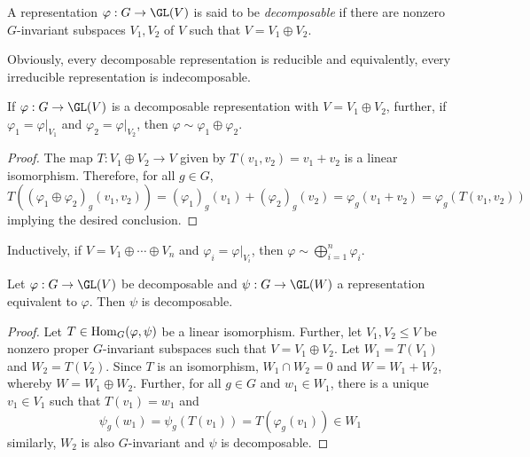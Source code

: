 \begin{definition}
    A representation $\varphi: G\to\GL(V)$ is said to be \textit{decomposable} if there are nonzero $G$-invariant subspaces $V_1,V_2$ of $V$ such that $V = V_1\oplus V_2$.
\end{definition}

Obviously, every decomposable representation is reducible and equivalently, every irreducible representation is indecomposable.

\begin{proposition}
    If $\varphi: G\to\GL(V)$ is a decomposable representation with $V = V_1\oplus V_2$, further, if $\varphi_1 = \varphi|_{V_1}$ and $\varphi_2 = \varphi|_{V_2}$, then $\varphi\sim\varphi_1\oplus\varphi_2$.
\end{proposition}
\begin{proof}
    The map $T: V_1\oplus V_2\to V$ given by $T(v_1,v_2) = v_1 + v_2$ is a linear isomorphism. Therefore, for all $g\in G$,
    \begin{equation*}
        T((\varphi_1\oplus\varphi_2)_g(v_1,v_2)) = (\varphi_1)_g(v_1) + (\varphi_2)_g(v_2) = \varphi_g(v_1 + v_2) = \varphi_g(T(v_1,v_2))
    \end{equation*}
    implying the desired conclusion.
\end{proof}

\begin{remark}
    Inductively, if $V = V_1\oplus\cdots\oplus V_n$ and $\varphi_i = \varphi|_{V_i}$, then $\varphi\sim\bigoplus_{i = 1}^n\varphi_i$.
\end{remark}

\begin{proposition}
    Let $\varphi: G\to\GL(V)$ be decomposable and $\psi: G\to\GL(W)$ a representation equivalent to $\varphi$. Then $\psi$ is decomposable.
\end{proposition}
\begin{proof}
    Let $T\in\operatorname{Hom}_G(\varphi,\psi)$ be a linear isomorphism. Further, let $V_1,V_2\le V$ be nonzero proper $G$-invariant subspaces such that $V = V_1\oplus V_2$. Let $W_1 = T(V_1)$ and $W_2 = T(V_2)$. Since $T$ is an isomorphism, $W_1\cap W_2 = 0$ and $W = W_1 + W_2$, whereby $W = W_1\oplus W_2$. Further, for all $g\in G$ and $w_1\in W_1$, there is a unique $v_1\in V_1$ such that $T(v_1) = w_1$ and 
    \begin{equation*}
        \psi_g(w_1) = \psi_g(T(v_1)) = T(\varphi_g(v_1))\in W_1
    \end{equation*}
    similarly, $W_2$ is also $G$-invariant and $\psi$ is decomposable.
\end{proof}

